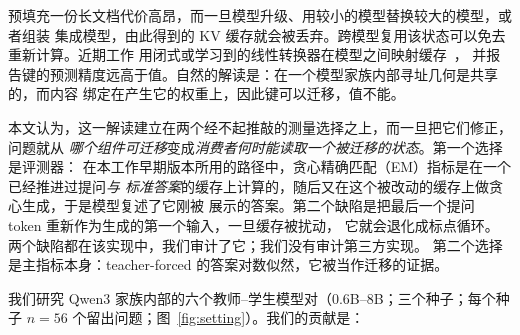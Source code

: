 \documentclass[11pt]{article}
\begin{document}
预填充一份长文档代价高昂，而一旦模型升级、用较小的模型替换较大的模型，或者组装
集成模型，由此得到的 KV 缓存就会被丢弃。跨模型复用该状态可以免去重新计算。近期工作
用闭式或学习到的线性转换器在模型之间映射缓存~\cite{heo2026crossmodel,fu2026c2c,lee2026translators,dery2026latentalign}，
并报告键的预测精度远高于值。自然的解读是：在一个模型家族内部寻址几何是共享的，而内容
绑定在产生它的权重上，因此键可以迁移，值不能。

本文认为，这一解读建立在两个经不起推敲的测量选择之上，而一旦把它们修正，问题就从
\emph{哪个组件可迁移}变成\emph{消费者何时能读取一个被迁移的状态}。第一个选择是评测器：
在本工作早期版本所用的路径中，贪心精确匹配（EM）指标是在一个已经推进过提问\emph{与
标准答案}的缓存上计算的，随后又在这个被改动的缓存上做贪心生成，于是模型复述了它刚被
展示的答案。第二个缺陷是把最后一个提问 token 重新作为生成的第一个输入，一旦缓存被扰动，
它就会退化成标点循环。两个缺陷都在该实现中，我们审计了它；我们没有审计第三方实现。
第二个选择是主指标本身：teacher-forced 的答案对数似然，它被当作迁移的证据。

我们研究 Qwen3 家族内部的六个教师--学生模型对（$0.6$B--$8$B；三个种子；每个种子
$n=56$ 个留出问题；图~\ref{fig:setting}）。我们的贡献是：
\end{document}
